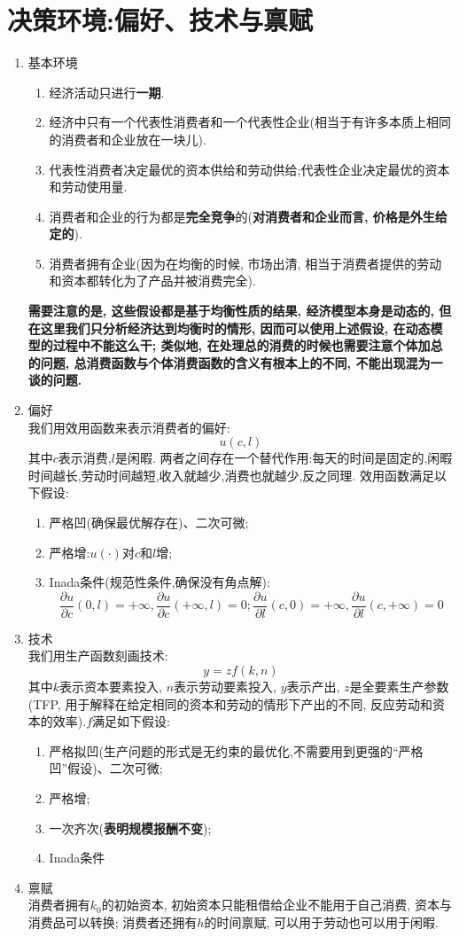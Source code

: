 \section{决策环境:偏好、技术与禀赋}
\begin{enumerate}
    \item 基本环境
    \begin{enumerate}
        \item 经济活动只进行\textbf{一期}.
        \item 经济中只有一个代表性消费者和一个代表性企业(相当于有许多本质上相同的消费者和企业放在一块儿).
        \item 代表性消费者决定最优的资本供给和劳动供给;代表性企业决定最优的资本和劳动使用量.
        \item 消费者和企业的行为都是\textbf{完全竞争}的(\textbf{对消费者和企业而言, 价格是外生给定的}).
        \item 消费者拥有企业(因为在均衡的时候, 市场出清, 相当于消费者提供的劳动和资本都转化为了产品并被消费完全).
    \end{enumerate}
    \textbf{需要注意的是, 这些假设都是基于均衡性质的结果, 经济模型本身是动态的, 但在这里我们只分析经济达到均衡时的情形, 因而可以使用上述假设, 在动态模型的过程中不能这么干;
    类似地, 在处理总的消费的时候也需要注意个体加总的问题, 总消费函数与个体消费函数的含义有根本上的不同, 不能出现混为一谈的问题.}
    \item 偏好\\
    我们用效用函数来表示消费者的偏好:
    $$u(c,l)$$
    其中$c$表示消费,$l$是闲暇. 两者之间存在一个替代作用:每天的时间是固定的,闲暇时间越长,劳动时间越短,收入就越少,消费也就越少,反之同理.
    效用函数满足以下假设:
    \begin{enumerate}
        \item 严格凹(确保最优解存在)、二次可微;
        \item 严格增:$u(\cdot)$对$c$和$l$增;
        \item Inada条件(规范性条件,确保没有角点解):$$\frac{\partial u}{\partial c}(0,l)=+\infty,\frac{\partial u}{\partial c}(+\infty,l)=0;\frac{\partial u}{\partial l}(c,0)=+\infty,\frac{\partial u}{\partial l}(c,+\infty)=0$$
     \end{enumerate}
    \item 技术\\
    我们用生产函数刻画技术:
    $$y=zf(k,n)$$
    其中$k$表示资本要素投入, $n$表示劳动要素投入, $y$表示产出, $z$是全要素生产参数(TFP, 用于解释在给定相同的资本和劳动的情形下产出的不同, 反应劳动和资本的效率).$f$满足如下假设:
    \begin{enumerate}
        \item 严格拟凹(生产问题的形式是无约束的最优化,不需要用到更强的“严格凹”假设)、二次可微;
        \item 严格增;
        \item 一次齐次(\textbf{表明规模报酬不变});
        \item Inada条件
    \end{enumerate}
    \item 禀赋\\
    消费者拥有$k_0$的初始资本, 初始资本只能租借给企业不能用于自己消费, 资本与消费品可以转换; 消费者还拥有$h$的时间禀赋, 可以用于劳动也可以用于闲暇.
\end{enumerate}
